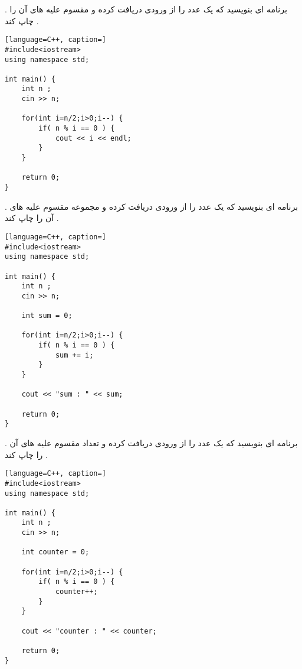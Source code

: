 \documentclass[12pt]{article}
\begin{document}
 . برنامه ای بنویسید که یک عدد را از ورودی دریافت کرده و مقسوم علیه های آن را چاپ کند .






\begin{latin}
\begin{lstlisting}[language=C++, caption=]
#include<iostream>
using namespace std;

int main() {
	int n ;
	cin >> n;
	
	for(int i=n/2;i>0;i--) {
		if( n % i == 0 ) {
			cout << i << endl;
		}
	}

	return 0;
}
\end{lstlisting}
\end{latin}






\newpage

 . برنامه ای بنویسید که یک عدد را از ورودی دریافت کرده و مجموعه مقسوم علیه های آن را چاپ کند .




\begin{latin}
\begin{lstlisting}[language=C++, caption=]
#include<iostream>
using namespace std;

int main() {
	int n ;
	cin >> n;
	
	int sum = 0;
	
	for(int i=n/2;i>0;i--) {
		if( n % i == 0 ) {
			sum += i;
		}
	}

	cout << "sum : " << sum;
	
	return 0;
}
\end{lstlisting}
\end{latin}








\newpage

 . برنامه ای بنویسید که یک عدد را از ورودی دریافت کرده و تعداد مقسوم علیه های آن را چاپ کند .







\begin{latin}
\begin{lstlisting}[language=C++, caption=]
#include<iostream>
using namespace std;

int main() {
	int n ;
	cin >> n;
	
	int counter = 0;
	
	for(int i=n/2;i>0;i--) {
		if( n % i == 0 ) {
			counter++;
		}
	}

	cout << "counter : " << counter;
	
	return 0;
}
\end{lstlisting}
\end{latin}
\end{document}
